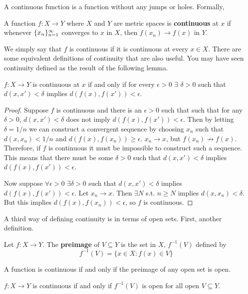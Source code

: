 A continuous function is a function without any jumps or
holes. Formally,
\begin{definition}
  A function $f:X \to Y$ where $X$ and $Y$ are metric spaces is
  \textbf{continuous} at $x$ if whenever $\{{x}_n \}_{n=1}^\infty$ converges to $x$ in
  $X$, then $f(x_n) \to f(x)$ in $Y$.  
\end{definition}
We simply say that $f$ is continuous if it is continuous at every $x
\in X$.  There are some equivalent definitions of continuity that are
also useful. You may have seen continuity defined as the result of the
following lemma.
\begin{lemma}\label{lem:ced}
  $f: X \to Y$ is continuous at $x$ if and only if for every
  $\epsilon>0$ $\exists$ $\delta >0$ such that $d(x,x') < \delta $
  implies $d(f(x),f(x')) < \epsilon$.
\end{lemma}
\begin{proof}
  Suppose $f$ is continuous and there is an $\epsilon>0$ such that
  such that for any $\delta>0$, $d(x,x') < \delta$ does not imply
  $d(f(x),f(x'))< \epsilon$. Then by letting $\delta = 1/n$ we can
  construct a convergent sequence by choosing $x_n$ such that
  $d(x,x_n) < 1/n$ and $d(f(x),f(x_n)) \geq \epsilon$. $x_n \to x$,
  but $f(x_n) \not\to f(x)$. Therefore, if $f$ is continuous it must
  be impossible to construct such a sequence. This means that there
  must be some $\delta>0$ such that $d(x,x') < \delta$ implies
  $d(f(x),f(x')) < \epsilon$.

  Now suppose $\forall \epsilon>0$ $\exists \delta>0$ such that
  $d(x,x')<\delta$ implies $d(f(x),f(x')) <\epsilon$. Let $x_n \to
  x$. Then $\exists N$ s.t. $n\geq N$ implies $d(x,x_n) < \delta$. But
  this implies $d(f(x),f(x_n)) < \epsilon$, so $f$ is continuous.
\end{proof}
A third way of defining continuity is in terms of open sets. First,
another definition.
\begin{definition}
  Let $f: X \to Y$. The \textbf{preimage} of $V \subseteq Y$ is the
  set in $X$, $f^{-1}(V)$ defined by
  \[ f^{-1} (V) = \{ x \in X: f(x) \in V \} \]
\end{definition}
A function is continuous if and only if the preimage of any open set
is open. 
\begin{lemma}\label{lem:copen}
  $f:X \to Y$ is continuous if and only if $f^{-1}(V)$ is open for all
  open $V \subseteq Y$. 
\end{lemma}
